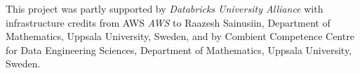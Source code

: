 \documentclass[main.tex]{subfiles}
\begin{document}
  This project was partly supported by \textit{Databricks University Alliance} with infrastructure credits from AWS \textit{AWS} to Raazesh Sainusiin, Department of Mathematics, Uppsala University, Sweden,
  and by Combient Competence Centre for Data Engineering Sciences, Department of Mathematics, Uppsala University, Sweden.
\end{document}
